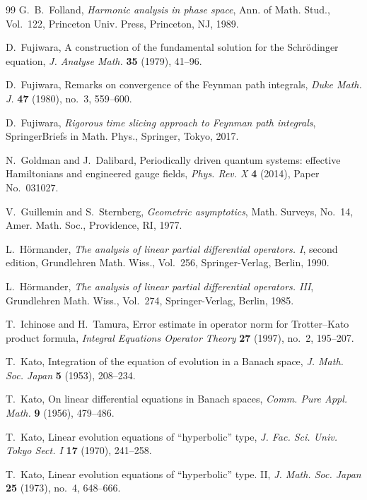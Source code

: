 \documentclass[11pt]{amsart}
\theoremstyle{plain}
\theoremstyle{definition}
\theoremstyle{remark}
\begin{document}
\begin{thebibliography}{99}
G.~B.~Folland,
\emph{Harmonic analysis in phase space},
Ann. of Math. Stud., Vol.~122,
Princeton Univ. Press, Princeton, NJ, 1989.

D.~Fujiwara,
A construction of the fundamental solution for the Schr\"odinger equation,
\emph{J. Analyse Math.} \textbf{35} (1979), 41--96.

D.~Fujiwara,
Remarks on convergence of the Feynman path integrals,
\emph{Duke Math. J.} \textbf{47} (1980), no.~3, 559--600.

D.~Fujiwara,
\emph{Rigorous time slicing approach to Feynman path integrals},
SpringerBriefs in Math. Phys.,
Springer, Tokyo, 2017.

N.~Goldman and J.~Dalibard,
Periodically driven quantum systems: effective Hamiltonians and engineered
gauge fields,
\emph{Phys. Rev. X} \textbf{4} (2014), Paper No.~031027.

V.~Guillemin and S.~Sternberg,
\emph{Geometric asymptotics},
Math. Surveys, No.~14,
Amer. Math. Soc., Providence, RI, 1977.

L.~H\"ormander,
\emph{The analysis of linear partial differential operators. I},
second edition,
Grundlehren Math. Wiss., Vol.~256,
Springer-Verlag, Berlin, 1990.

L.~H\"ormander,
\emph{The analysis of linear partial differential operators. III},
Grundlehren Math. Wiss., Vol.~274,
Springer-Verlag, Berlin, 1985.

T.~Ichinose and H.~Tamura,
Error estimate in operator norm for Trotter--Kato product formula,
\emph{Integral Equations Operator Theory} \textbf{27} (1997), no.~2,
195--207.

T.~Kato,
Integration of the equation of evolution in a Banach space,
\emph{J. Math. Soc. Japan} \textbf{5} (1953), 208--234.

T.~Kato,
On linear differential equations in Banach spaces,
\emph{Comm. Pure Appl. Math.} \textbf{9} (1956), 479--486.

T.~Kato,
Linear evolution equations of ``hyperbolic'' type,
\emph{J. Fac. Sci. Univ. Tokyo Sect. I} \textbf{17} (1970), 241--258.

T.~Kato,
Linear evolution equations of ``hyperbolic'' type. II,
\emph{J. Math. Soc. Japan} \textbf{25} (1973), no.~4, 648--666.


\end{thebibliography}
\end{document}
